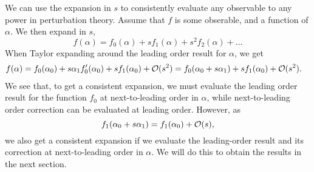 We can use the expansion in $s$ to consistently evaluate any observable to any power in perturbation theory.
Assume that $f$ is some obserable, and a function of $\alpha$.
We then expand in $s$,
%
\begin{equation}
    f(\alpha) = f_0(\alpha) + s f_1(\alpha) + s^2 f_2(\alpha) + \dots
\end{equation}
%
When Taylor expanding around the leading order result for $\alpha$, we get
%
\begin{align*}
    f(\alpha) 
    & 
    = 
    f_0(\alpha_0)
    +
    s\alpha_1  f_0'(\alpha_0)
    +
    s f_1(\alpha_0)
    + \mathcal O(s^2)
    = f_0(\alpha_0 + s \alpha_1)
    + s f_1(\alpha_0)
    + \mathcal O(s^2).
\end{align*}
%
We see that, to get a consistent expansion, we must evaluate the leading order result for the function $f_0$ at next-to-leading order in $\alpha$, while next-to-leading order correction can be evaluated at leading order.
However, as
%
\begin{equation}
    f_1(\alpha_0 + s\alpha_1) = f_1(\alpha_0) + \mathcal O(s),
\end{equation}
%
we also get a consistent expansion if we evaluate the leading-order result and its correction at next-to-leading order in $\alpha$.
We will do this to obtain the results in the next section.
